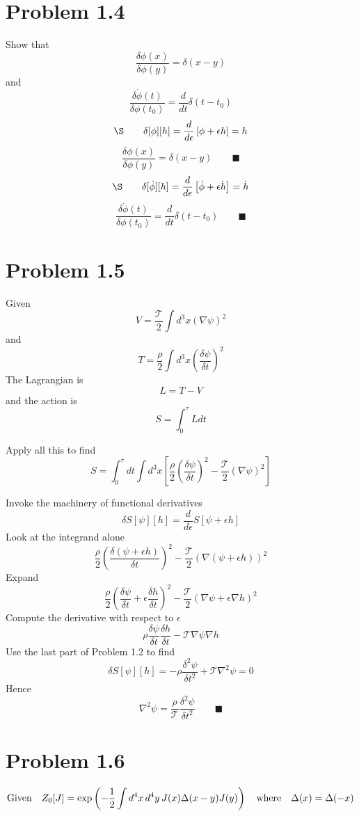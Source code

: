 \documentclass{memoir}
\begin{document}
\section*{Problem 1.4}
Show that \[\frac{\delta\phi(x)}{\delta\phi(y)}=\delta(x-y)\]
and \[\frac{\delta\dot{\phi}(t)}{\delta\phi(t_0)}=\frac{d}{dt}\delta(t-t_0)\]
\[\S\qquad\delta[\phi][h]=\frac{d}{d\epsilon}\left[\phi+\epsilon h\right]=h\]
\[\frac{\delta\phi(x)}{\delta\phi(y)}=\delta(x-y) \qquad \blacksquare\]
\[\S\qquad\delta[\dot{\phi}][h]=\frac{d}{d\epsilon}\left[\dot{\phi}+\epsilon \dot{h}\right]=\dot{h}\]
\[\frac{\delta\dot{\phi}(t)}{\delta\phi(t_0)}=\frac{d}{dt}\delta(t-t_0) \qquad \blacksquare\]


\section*{Problem 1.5}
Given \[V=\frac{\mathcal{T}}{2}\int d^3 x(\nabla\psi)^2\]
and \[T=\frac{\rho}{2}\int d^3 x\left(\frac{\delta \psi}{\delta t}\right)^2\]
The Lagrangian is \[L=T-V\] and the action is \[S=\int_0^\tau Ldt\]

Apply all this to find
\[S=\int_0^\tau dt \int d^3 x\left[\frac{\rho}{2}\left(\frac{\delta \psi}{\delta t}\right)^2 - \frac{\mathcal{T}}{2}(\nabla\psi)^2 \right]\]

Invoke the machinery of functional derivatives
\[\delta S[\psi][h]=\frac{d}{d\epsilon}S[\psi+\epsilon h]\]
Look at the integrand alone
\[\frac{\rho}{2}\left(\frac{\delta (\psi+\epsilon h)}{\delta t}\right)^2 - \frac{\mathcal{T}}{2}\left(\nabla(\psi+\epsilon h)\right)^2\]
Expand
\[\frac{\rho}{2}\left(\frac{\delta \psi}{\delta t}+\epsilon \frac{\delta h}{\delta t}\right)^2 - \frac{\mathcal{T}}{2}\left(\nabla \psi+\epsilon \nabla h\right)^2\]
Compute the derivative with respect to $\epsilon$
\[\rho\frac{\delta \psi}{\delta t}\frac{\delta h}{\delta t} - \mathcal{T}\nabla \psi \nabla h\]
Use the last part of Problem 1.2 to find
\[\delta S[\psi][h]=-\rho\frac{\delta^2 \psi}{\delta t^2} + \mathcal{T}\nabla^2 \psi =0\]
Hence
\[\nabla^2 \psi=\frac{\rho}{\mathcal{T}}\frac{\delta^2 \psi}{\delta t^2} \qquad \blacksquare\]

\section*{Problem 1.6}
\[\qq*{Given}Z_0[J]=\exp\left(-\frac{1}{2}\int d^4 x\, d^4 y\, J(x) \Delta(x-y) J(y)\right)\qq{where}\Delta(x)=\Delta(-x)\]
\end{document}
